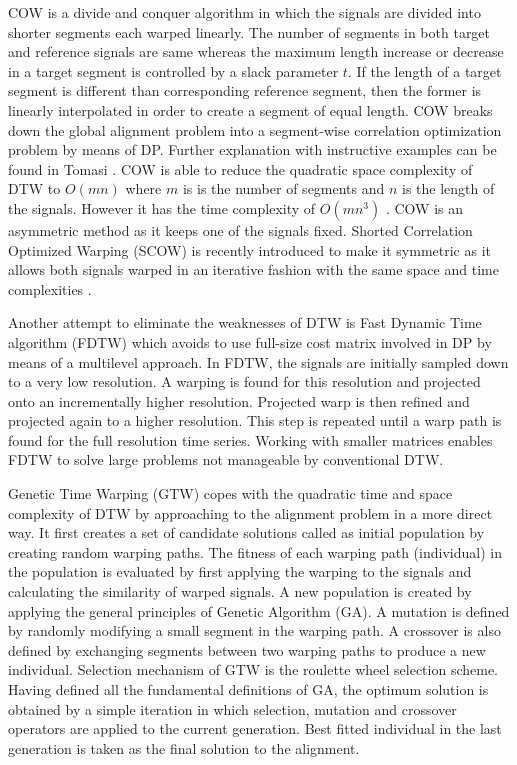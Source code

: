 \documentclass[number,1p,12pt]{elsarticle}
\begin{document}
COW is a divide and conquer algorithm in which the signals are divided into shorter segments each warped linearly. The number of segments in both target and reference signals are same whereas the maximum length increase or decrease in a target segment is controlled by a slack parameter $t$. If the length of a target segment is different than corresponding reference segment, then the former is linearly interpolated in order to create a segment of equal length. COW breaks down the global alignment problem into a segment-wise correlation optimization problem by means of DP. Further explanation with instructive examples can be found in Tomasi \cite{Tomasi2004}. COW is able to reduce the quadratic space complexity of DTW to $O(mn)$ where $m$ is is the number of segments and $n$ is the length of the signals. However it has the time complexity of $O(mn^3)$ \cite{Smith2009}. COW is an asymmetric method as it keeps one of the signals fixed. Shorted Correlation Optimized Warping (SCOW) is recently introduced to make it symmetric as it allows both signals warped in an iterative fashion with the same space and time complexities \cite{Smith2009A}. 

Another attempt to eliminate the weaknesses of DTW is Fast Dynamic Time algorithm (FDTW) which avoids to use full-size cost matrix involved in DP by means of a multilevel approach. In FDTW, the signals are initially sampled down to a very low resolution. A warping is found for this resolution and projected onto an incrementally higher resolution. Projected warp is then refined and projected again to a higher resolution. This step is repeated until a warp path is found for the full resolution time series. Working with smaller matrices enables FDTW to solve large problems not manageable by conventional DTW. 

Genetic Time Warping (GTW) copes with the quadratic time and space complexity of DTW by approaching to the alignment problem in a more direct way. It first creates a set of candidate solutions called as initial population by creating random warping paths. The fitness of each warping path (individual) in the population is evaluated by first applying the warping to the signals and calculating the similarity of warped signals. A new population is created by applying the general principles of Genetic Algorithm (GA). A mutation is defined by randomly modifying a small segment in the warping path. A crossover is also defined by exchanging segments between two warping paths to produce a new individual. Selection mechanism of GTW is the roulette wheel selection scheme. Having defined all the fundamental definitions of GA, the optimum solution is obtained by a simple iteration in which selection, mutation and crossover operators are applied to the current generation. Best fitted individual in the last generation is taken as the final solution to the alignment. 
\end{document}
